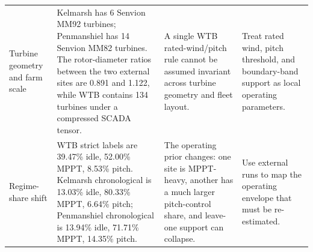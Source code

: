 \begin{tabularx}{0.98\textwidth}{>{\raggedright\arraybackslash}p{} >{\raggedright\arraybackslash}X >{\raggedright\arraybackslash}X >{\raggedright\arraybackslash}X}
Turbine geometry and farm scale & Kelmarsh has 6 Senvion MM92 turbines; Penmanshiel has 14 Senvion MM82 turbines. The rotor-diameter ratios between the two external sites are 0.891 and 1.122, while WTB contains 134 turbines under a compressed SCADA tensor. & A single WTB rated-wind/pitch rule cannot be assumed invariant across turbine geometry and fleet layout. & Treat rated wind, pitch threshold, and boundary-band support as local operating parameters. \\
Regime-share shift & WTB strict labels are 39.47\% idle, 52.00\% MPPT, 8.53\% pitch. Kelmarsh chronological is 13.03\% idle, 80.33\% MPPT, 6.64\% pitch; Penmanshiel chronological is 13.94\% idle, 71.71\% MPPT, 14.35\% pitch. & The operating prior changes: one site is MPPT-heavy, another has a much larger pitch-control share, and leave-one support can collapse. & Use external runs to map the operating envelope that must be re-estimated. \\
\bottomrule
\end{tabularx}
